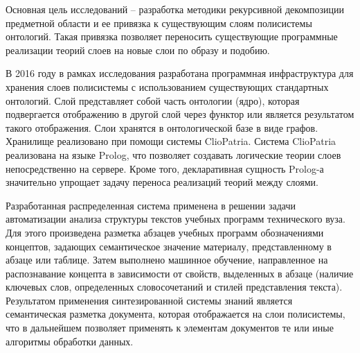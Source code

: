 \documentclass[12pt,a4paper]{extarticle}
\begin{document}
Основная цель исследований -- разработка методики рекурсивной декомпозиции
предметной области и ее привязка к существующим слоям полисистемы онтологий.
Такая привязка позволяет переносить существующие программные реализации теорий
слоев на новые слои по образу и подобию.

В 2016 году в рамках исследования разработана программная инфраструктура для
хранения слоев полисистемы с использованием существующих стандартных онтологий.
Слой представляет собой часть онтологии (ядро), которая подвергается отображению
в другой слой через функтор или является результатом такого отображения.  Слои
хранятся в онтологической базе в виде графов.  Хранилище реализовано при помощи
системы ClioPatria.  Система ClioPatria реализована на языке Prolog, что
позволяет создавать логические теории слоев непосредственно на сервере.  Кроме
того, декларативная сущность Prolog-а значительно упрощает задачу переноса
реализаций теорий между слоями.

Разработанная распределенная система применена в решении задачи автоматизации
анализа структуры текстов учебных программ технического вуза.  Для этого
произведена разметка абзацев учебных программ обозначениями концептов, задающих
семантическое значение материалу, представленному в абзаце или таблице.  Затем
выполнено машинное обучение, направленное на распознавание концепта в
зависимости от свойств, выделенных в абзаце (наличие ключевых слов, определенных
словосочетаний и стилей представления текста).  Результатом применения
синтезированной системы знаний является семантическая разметка документа,
которая отображается на слои полисистемы, что в дальнейшем позволяет применять к
элементам документов те или иные алгоритмы обработки данных.
\end{document}
